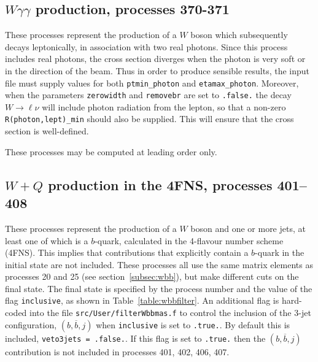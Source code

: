 \documentclass[12pt]{article}
\begin{document}
\subsection{$W\gamma\gamma$ production, processes 370-371}
\label{subsec:wgamgam}

These processes represent the production of a $W$ boson which subsequently
decays leptonically, in association with two real photons.
Since this process includes real photons, the cross section diverges
when the photon is very soft or in the direction of the beam.
Thus in order to produce sensible results, the input file must supply values for both
{\tt ptmin\_photon} and {\tt etamax\_photon}. Moreover, when the parameters {\tt zerowidth}
and {\tt removebr} are set to {\tt .false.} the decay $W \to \ell \nu$ will include
photon radiation from the lepton, so that a non-zero {\tt R(photon,lept)\_min} should
also be supplied. This will ensure that the cross section is well-defined.

These processes may be computed at leading order only.

\subsection{$W+Q$ production in the 4FNS, processes 401--408}
\label{subsec:wbbfilter}
These processes represent the production of a $W$ boson and one or more jets,
at least one of which is a $b$-quark, calculated in the 4-flavour number scheme (4FNS). 
This implies that contributions that explicitly contain a $b$-quark in the initial state
are not included.
These processes all use the same matrix
elements as processes 20 and 25 (see section~\ref{subsec:wbb}), but make different
cuts on the final state. The final state is specified by the process number and
the value of the flag {\tt inclusive}, as shown in Table~\ref{table:wbbfilter}.
An additional flag is hard-coded into the file {\tt src/User/filterWbbmas.f} to control
the inclusion of the 3-jet configuration, $(b,\overline b,j)$ when {\tt inclusive} is set to {\tt .true.}.
By default this is included, {\tt veto3jets = .false.}. If this flag is set to {\tt .true.} 
then the $(b,\overline b,j)$ contribution
is not included in processes 401, 402, 406, 407.
\end{document}
